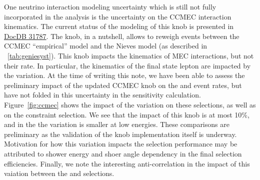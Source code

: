 One neutrino interaction modeling uncertainty which is still not fully incorporated in the analysis is the uncertainty on the CCMEC interaction kinematics. The current status of the modeling of this knob is presented in \href{https://microboone-docdb.fnal.gov/cgi-bin/private/ShowDocument?docid=31787}{DocDB 31787}. The knob, in a nutshell, allows to reweigh events between the CCMEC ``empirical'' model and the Nieves model (as described in ~\cref{tab:geniesyst}). This knob impacts the kinematics of MEC interactions, but not their rate. In particular, the kinematics of the final state lepton are impacted by the variation. At the time of writing this note, we have been able to assess the preliminary impact of the updated CCMEC knob on the \npsel and \zpsel event rates, but have not folded in this uncertainty in the sensitivity calculation. Figure~\ref{fig:ccmec} shows the impact of the variation on these selections, as well as on the constraint \numu selection. We see that the impact of this knob is at most 10\%, and in the \npsel the variation is smaller at low energies. These comparisons are preliminary as the validation of the knob implementation itself is underway. Motivation for how this variation impacts the selection performance may be attributed to shower energy and shoer angle dependency in the final selection efficiencies. Finally, we note the interesting anti-correlation in the impact of this vaiation between the \npsel and \zpsel selections.

